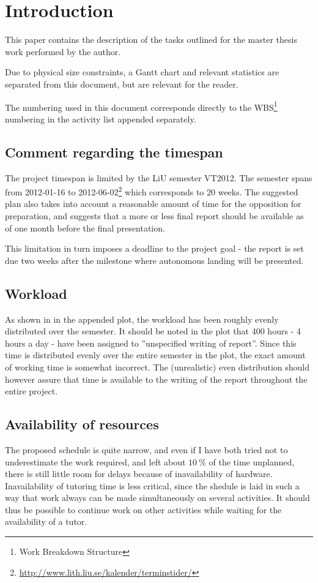 \section*{Introduction}
This paper contains the description of the tasks outlined for the
master thesis work performed by the author.

Due to physical size constraints, a Gantt chart and relevant statistics
are separated from this document, but are relevant for the reader.

The numbering used in this document corresponds directly to the WBS\footnote{Work Breakdown Structure} numbering
in the activity list appended separately.

    \subsection*{Comment regarding the timespan}
        The project timespan is limited by the LiU semester VT2012.
        The semester spans from 2012-01-16 to 2012-06-02\footnote{\url{http://www.lith.liu.se/kalender/terminstider/}}
        which corresponds to 20 weeks.
        The suggested plan also takes into account a reasonable amount
        of time for the opposition for preparation, and suggests that a
        more or less final report should be available as of one month
        before the final presentation.

        This limitation in turn imposes a deadline to the project goal -
        the report is set due two weeks after the milestone where autonomous
        landing will be presented.

    \subsection*{Workload}
        As shown in in the appended plot, the workload has been roughly evenly
        distributed over the semester. It should be noted in the plot that
        400 hours - 4 hours a day - have been assigned to ''unspecified writing
        of report''. Since this time is distributed evenly over the entire
        semester in the plot, the exact amount of working time is somewhat incorrect.
        The (unrealistic) even distribution should however assure that time
        is available to the writing of the report throughout the entire project.

    \subsection*{Availability of resources}
        The proposed schedule is quite narrow, and even if I have both tried not
        to underestimate the work required, and left about $10~\%$ of the time
        unplanned, there is still little room for delays because of inavailability
        of hardware. Inavailability of tutoring time is less critical, since
        the shedule is laid in such a way that work always can be made
        simultaneously on several activities. It should thus be possible
        to continue work on other activities while waiting for the availability
        of a tutor.
